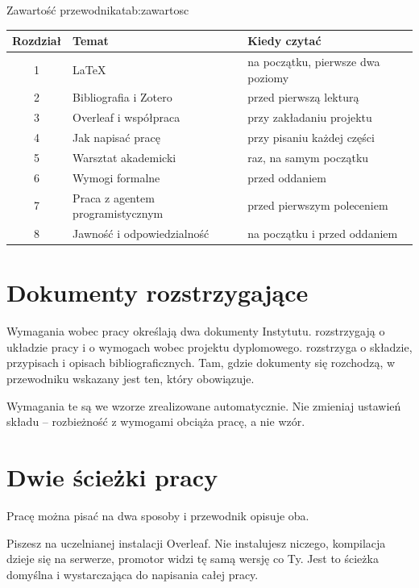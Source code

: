 \begin{tabelaepi}{Zawartość przewodnika}{tab:zawartosc}
\begin{tabular}{@{}cp{6.4cm}p{6.2cm}@{}}
\toprule
Rozdział & Temat & Kiedy czytać \\
\midrule
1 & LaTeX & na początku, pierwsze dwa poziomy \\
2 & Bibliografia i Zotero & przed pierwszą lekturą \\
3 & Overleaf i współpraca & przy zakładaniu projektu \\
4 & Jak napisać pracę & przy pisaniu każdej części \\
5 & Warsztat akademicki & raz, na samym początku \\
6 & Wymogi formalne & przed oddaniem \\
7 & Praca z agentem programistycznym & przed pierwszym poleceniem \\
8 & Jawność i odpowiedzialność & na początku i przed oddaniem \\
\bottomrule
\end{tabular}
\end{tabelaepi}

\section{Dokumenty rozstrzygające}

Wymagania wobec pracy określają dwa dokumenty Instytutu.  \parencite{standardyEPI} rozstrzygają o układzie pracy i o wymogach wobec projektu dyplomowego.  \parencite{instrukcjaISI} rozstrzyga o składzie, przypisach i opisach bibliograficznych. Tam, gdzie dokumenty się rozchodzą, w przewodniku wskazany jest ten, który obowiązuje.

Wymagania te są we wzorze zrealizowane automatycznie. Nie zmieniaj ustawień składu -- rozbieżność z wymogami obciąża pracę, a nie wzór.

\section{Dwie ścieżki pracy}\label{sec:sciezki}

Pracę można pisać na dwa sposoby i przewodnik opisuje oba.

 Piszesz na uczelnianej instalacji Overleaf.
Nie instalujesz niczego, kompilacja dzieje się na serwerze, promotor widzi tę samą
wersję co Ty. Jest to ścieżka domyślna i wystarczająca do napisania całej pracy.

